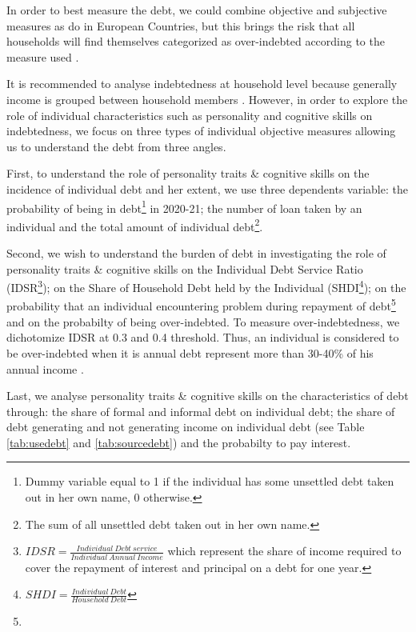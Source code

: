 \documentclass[a4paper, 11pt, onecolumn]{article}
\begin{document}
In order to best measure the debt, we could combine objective and subjective measures as \cite{Aniola2012} do in European Countries, but this brings the risk that all households will find themselves categorized as over-indebted according to the measure used \citep{Chichaibelu2018}.

It is recommended to analyse indebtedness at household level because generally income is grouped between household members \citep{European2010}.
However, in order to explore the role of individual characteristics such as personality and cognitive skills on indebtedness, we focus on three types of individual objective measures allowing us to understand the debt from three angles.

First, to understand the role of personality traits \& cognitive skills on the incidence of individual debt and her extent, we use three dependents variable: the probability of being in debt\footnote{Dummy variable equal to 1 if the individual has some unsettled debt taken out in her own name, 0 otherwise.} in 2020-21; the number of loan taken by an individual and the total amount of individual debt\footnote{The sum of all unsettled debt taken out in her own name.}.

Second, we wish to understand the burden of debt in investigating the role of personality traits \& cognitive skills on the Individual Debt Service Ratio (IDSR\footnote{$IDSR=\frac{Individual~Debt~service}{Individual~Annual~Income}$ which represent the share of income required to cover the repayment of interest and principal on a debt for one year.}); on the Share of Household Debt held by the Individual (SHDI\footnote{$SHDI=\frac{Individual~Debt}{Household~Debt}$}); on the probability that an individual encountering problem during repayment of debt\footnote{} and on the probabilty of being over-indebted.
To measure over-indebtedness, we dichotomize IDSR at 0.3 and 0.4 threshold.
Thus, an individual is considered to be over-indebted when it is annual debt represent more than 30-40\% of his annual income \citep{Chichaibelu2017, DAlessio2013}.

Last, we analyse personality traits \& cognitive skills on the characteristics of debt through: the share of formal and informal debt on individual debt; the share of debt generating and not generating income on individual debt (see Table \ref{tab:usedebt} and \ref{tab:sourcedebt}) and the probabilty to pay interest.

\end{document}
